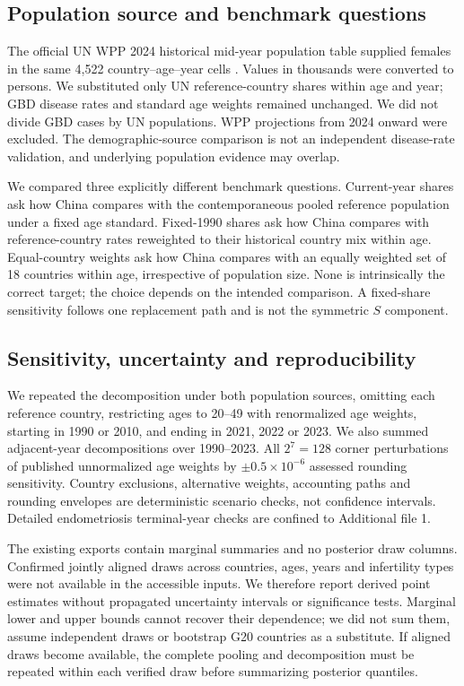\documentclass[11pt,a4paper]{article}
\begin{document}
\subsection{Population source and benchmark questions}
The official UN WPP 2024 historical mid-year population table supplied females in the same 4,522 country--age--year cells \cite{wpp2024}. Values in thousands were converted to persons. We substituted only UN reference-country shares within age and year; GBD disease rates and standard age weights remained unchanged. We did not divide GBD cases by UN populations. WPP projections from 2024 onward were excluded. The demographic-source comparison is not an independent disease-rate validation, and underlying population evidence may overlap.

We compared three explicitly different benchmark questions. Current-year shares ask how China compares with the contemporaneous pooled reference population under a fixed age standard. Fixed-1990 shares ask how China compares with reference-country rates reweighted to their historical country mix within age. Equal-country weights ask how China compares with an equally weighted set of 18 countries within age, irrespective of population size. None is intrinsically the correct target; the choice depends on the intended comparison. A fixed-share sensitivity follows one replacement path and is not the symmetric $S$ component.

\subsection{Sensitivity, uncertainty and reproducibility}
We repeated the decomposition under both population sources, omitting each reference country, restricting ages to 20--49 with renormalized age weights, starting in 1990 or 2010, and ending in 2021, 2022 or 2023. We also summed adjacent-year decompositions over 1990--2023. All $2^7=128$ corner perturbations of published unnormalized age weights by $\pm0.5\times10^{-6}$ assessed rounding sensitivity. Country exclusions, alternative weights, accounting paths and rounding envelopes are deterministic scenario checks, not confidence intervals. Detailed endometriosis terminal-year checks are confined to Additional file 1.

The existing exports contain marginal summaries and no posterior draw columns. Confirmed jointly aligned draws across countries, ages, years and infertility types were not available in the accessible inputs. We therefore report derived point estimates without propagated uncertainty intervals or significance tests. Marginal lower and upper bounds cannot recover their dependence; we did not sum them, assume independent draws or bootstrap G20 countries as a substitute. If aligned draws become available, the complete pooling and decomposition must be repeated within each verified draw before summarizing posterior quantiles.
\end{document}
